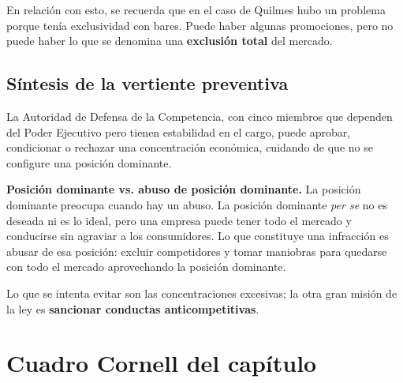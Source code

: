 \documentclass[12pt,oneside]{book}
\begin{document}
En relación con esto, se recuerda que en el caso de Quilmes hubo un problema porque tenía exclusividad con bares. Puede haber algunas promociones, pero no puede haber lo que se denomina una \textbf{exclusión total} del mercado.

\subsection{Síntesis de la vertiente preventiva}

La Autoridad de Defensa de la Competencia, con cinco miembros que dependen del Poder Ejecutivo pero tienen estabilidad en el cargo, puede aprobar, condicionar o rechazar una concentración económica, cuidando de que no se configure una posición dominante.

\begin{important}
\textbf{Posición dominante vs. abuso de posición dominante.} La posición dominante preocupa cuando hay un abuso. La posición dominante \textit{per se} no es deseada ni es lo ideal, pero una empresa puede tener todo el mercado y conducirse sin agraviar a los consumidores. Lo que constituye una infracción es abusar de esa posición: excluir competidores y tomar maniobras para quedarse con todo el mercado aprovechando la posición dominante.
\end{important}

Lo que se intenta evitar son las concentraciones excesivas; la otra gran misión de la ley es \textbf{sancionar conductas anticompetitivas}.

\section{Cuadro Cornell del capítulo}
\end{document}
